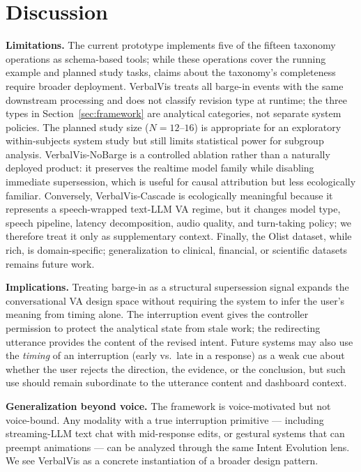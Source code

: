 \documentclass[journal]{IEEEtran}
\begin{document}
\section{Discussion}
\label{sec:discussion}

\textbf{Limitations.} The current prototype implements five of the fifteen taxonomy operations as schema-based tools; while these operations cover the running example and planned study tasks, claims about the taxonomy's completeness require broader deployment. VerbalVis treats all barge-in events with the same downstream processing and does not classify revision type at runtime; the three types in Section~\ref{sec:framework} are analytical categories, not separate system policies. The planned study size ($N{=}12$--$16$) is appropriate for an exploratory within-subjects system study but still limits statistical power for subgroup analysis. VerbalVis-NoBarge is a controlled ablation rather than a naturally deployed product: it preserves the realtime model family while disabling immediate supersession, which is useful for causal attribution but less ecologically familiar. Conversely, VerbalVis-Cascade is ecologically meaningful because it represents a speech-wrapped text-LLM VA regime, but it changes model type, speech pipeline, latency decomposition, audio quality, and turn-taking policy; we therefore treat it only as supplementary context. Finally, the Olist dataset, while rich, is domain-specific; generalization to clinical, financial, or scientific datasets remains future work.

\textbf{Implications.} Treating barge-in as a structural supersession signal expands the conversational VA design space without requiring the system to infer the user's meaning from timing alone. The interruption event gives the controller permission to protect the analytical state from stale work; the redirecting utterance provides the content of the revised intent. Future systems may also use the \emph{timing} of an interruption (early vs.\ late in a response) as a weak cue about whether the user rejects the direction, the evidence, or the conclusion, but such use should remain subordinate to the utterance content and dashboard context.

\textbf{Generalization beyond voice.} The framework is voice-motivated but not voice-bound. Any modality with a true interruption primitive --- including streaming-LLM text chat with mid-response edits, or gestural systems that can preempt animations --- can be analyzed through the same Intent Evolution lens. We see VerbalVis as a concrete instantiation of a broader design pattern.
\end{document}
